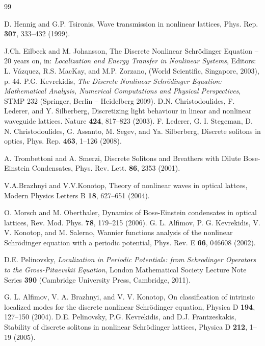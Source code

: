 \documentclass[12pt,reqno]{amsart}
\begin{document}
\begin{thebibliography}{99}
	
 D. Hennig and G.P. Tsironis, Wave transmission in nonlinear lattices, Phys. Rep. {\bf 307}, 333--432 (1999). 
	
 J.Ch. Eilbeck and M. Johansson, The Discrete Nonlinear Schr\"odinger Equation -- 20 years on, in: {\em Localization and Energy Transfer in Nonlinear Systems}, Editors: L. Vázquez, R.S. MacKay, and M.P. Zorzano, 
(World Scientific, Singapore, 2003), p. 44. 
 P.G. Kevrekidis, {\em The Discrete Nonlinear Schr\"odinger 
 Equation: Mathematical Analysis, Numerical Computations and Physical Perspectives}, STMP 232 (Springer, Berlin -- Heidelberg 2009).
 D.N. Christodoulides, F. Lederer, and Y. Silberberg, Discretizing light behaviour in linear and nonlinear waveguide lattices. 
Nature {\bf 424}, 817--823 (2003). 
  F. Lederer, G. I. Stegeman, D. N. Christodoulides, G. Assanto, M. Segev, and Ya. Silberberg,
Discrete solitons in optics, Phys. Rep.  {\bf 463}, 1--126 (2008).

 A. Trombettoni and A. Smerzi, Discrete Solitons and Breathers with Dilute Bose-Einstein Condensates, Phys. Rev. Lett. {\bf 86}, 2353 (2001).

 V.A.Brazhnyi and V.V.Konotop, Theory of nonlinear waves in optical lattces, Modern Physics Letters B {\bf 18}, 627--651 (2004).

 O. Morsch and M. Oberthaler, Dynamics of Bose-Einstein condensates in optical lattices, Rev. Mod. Phys. {\bf 78},  179--215 (2006).
%
 G. L. Alfimov, P. G. Kevrekidis, V. V. Konotop, and M. Salerno, Wannier functions analysis of the nonlinear Schr\"odinger equation with a periodic potential, Phys. Rev. E {\bf 66}, 046608 (2002).

 D.E. Pelinovsky, {\em Localization in Periodic Potentials: from Schrodinger Operators to the Gross-Pitaevskii Equation}, London Mathematical Society Lecture Note Series {\bf 390} (Cambridge University Press, Cambridge, 2011).

 G. L. Alfimov, V. A. Brazhnyi, and V. V. Konotop, On classification of intrinsic localized modes for the discrete nonlinear Schr\"odinger equation, Physica D {\bf 194}, 127--150 (2004).
%
 D.E. Pelinovsky, P.G. Kevrekidis, and D.J. Frantzeskakis, Stability of discrete solitons in nonlinear Schr\"odinger lattices, Physica D {\bf 212}, 1--19 (2005).


\end{thebibliography}
\end{document}
